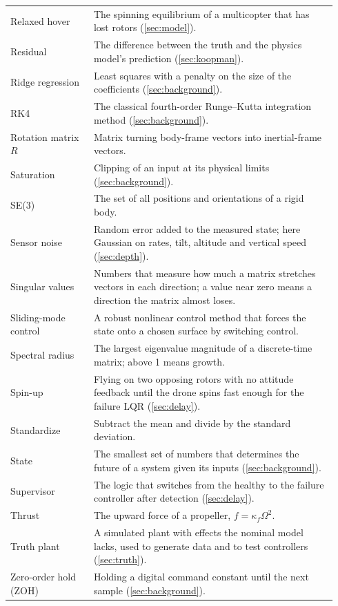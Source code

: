\begin{longtable}{p{0.24\linewidth}p{0.70\linewidth}}
Relaxed hover & The spinning equilibrium of a multicopter that has lost rotors (\ref{sec:model}). \\
Residual & The difference between the truth and the physics model's prediction (\ref{sec:koopman}). \\
Ridge regression & Least squares with a penalty on the size of the coefficients (\ref{sec:background}). \\
RK4 & The classical fourth-order Runge--Kutta integration method (\ref{sec:background}). \\
Rotation matrix $R$ & Matrix turning body-frame vectors into inertial-frame vectors. \\
Saturation & Clipping of an input at its physical limits (\ref{sec:background}). \\
SE(3) & The set of all positions and orientations of a rigid body. \\
Sensor noise & Random error added to the measured state; here Gaussian on rates, tilt, altitude and vertical speed (\ref{sec:depth}). \\
Singular values & Numbers that measure how much a matrix stretches vectors in each direction; a value near zero means a direction the matrix almost loses. \\
Sliding-mode control & A robust nonlinear control method that forces the state onto a chosen surface by switching control. \\
Spectral radius & The largest eigenvalue magnitude of a discrete-time matrix; above 1 means growth. \\
Spin-up & Flying on two opposing rotors with no attitude feedback until the drone spins fast enough for the failure LQR (\ref{sec:delay}). \\
Standardize & Subtract the mean and divide by the standard deviation. \\
State & The smallest set of numbers that determines the future of a system given its inputs (\ref{sec:background}). \\
Supervisor & The logic that switches from the healthy to the failure controller after detection (\ref{sec:delay}). \\
Thrust & The upward force of a propeller, $f = \kappa_f\Omega^2$. \\
Truth plant & A simulated plant with effects the nominal model lacks, used to generate data and to test controllers (\ref{sec:truth}). \\
Zero-order hold (ZOH) & Holding a digital command constant until the next sample (\ref{sec:background}). \\
\bottomrule
\end{longtable}
\normalsize

